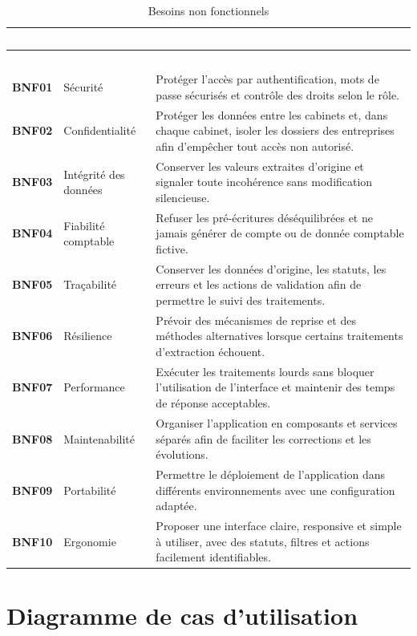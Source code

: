 \documentclass[12pt,a4paper,oneside]{report}
\newcommand{\TableSetup}{%
  \arrayrulecolor{ComptaTableLine}%
  \setlength{\arrayrulewidth}{0.45pt}%
  \renewcommand{\arraystretch}{1.18}%
}
\newcommand{\TableHead}[1]{\textcolor{white}{\textbf{#1}}}
\newcommand{\TableId}[1]{\textcolor{ComptaGreen}{\textbf{#1}}}
\begin{document}
\TableSetup
\begin{longtable}{|L{1.5cm}|L{4.2cm}|L{8.7cm}|}
\caption{Besoins non fonctionnels}\label{tab:bnf}\\
\toprule
{}\TableHead{ID} & \TableHead{Qualité} & \TableHead{Exigence} \\
\midrule
\endfirsthead
\toprule
{}\TableHead{ID} & \TableHead{Qualité} & \TableHead{Exigence} \\
\midrule
\endhead
\TableId{BNF01} & Sécurité & Protéger l'accès par authentification, mots de passe sécurisés et contrôle des droits selon le rôle. \\
\TableId{BNF02} & Confidentialité & Protéger les données entre les cabinets et, dans chaque cabinet, isoler les dossiers des entreprises afin d'empêcher tout accès non autorisé. \\
\TableId{BNF03} & Intégrité des données & Conserver les valeurs extraites d'origine et signaler toute incohérence sans modification silencieuse. \\
\TableId{BNF04} & Fiabilité comptable & Refuser les pré-écritures déséquilibrées et ne jamais générer de compte ou de donnée comptable fictive. \\
\TableId{BNF05} & Traçabilité & Conserver les données d'origine, les statuts, les erreurs et les actions de validation afin de permettre le suivi des traitements. \\
\TableId{BNF06} & Résilience & Prévoir des mécanismes de reprise et des méthodes alternatives lorsque certains traitements d'extraction échouent. \\
\TableId{BNF07} & Performance & Exécuter les traitements lourds sans bloquer l'utilisation de l'interface et maintenir des temps de réponse acceptables. \\
\TableId{BNF08} & Maintenabilité & Organiser l'application en composants et services séparés afin de faciliter les corrections et les évolutions. \\
\TableId{BNF09} & Portabilité & Permettre le déploiement de l'application dans différents environnements avec une configuration adaptée. \\
\TableId{BNF10} & Ergonomie & Proposer une interface claire, responsive et simple à utiliser, avec des statuts, filtres et actions facilement identifiables. \\
\bottomrule
\end{longtable}

\section{Diagramme de cas d'utilisation}
\end{document}

